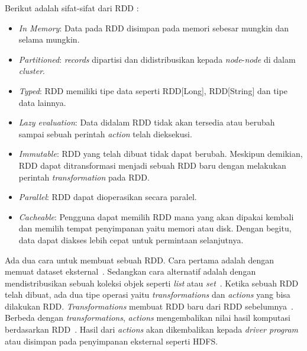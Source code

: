 Berikut adalah sifat-sifat dari RDD :
\begin{itemize}

\item \textit{In Memory}: Data pada RDD disimpan pada memori sebesar mungkin dan selama mungkin.

\item \textit{Partitioned}: \textit{records} dipartisi dan didistribusikan kepada \textit{node}-\textit{node} di dalam \textit{cluster}.

\item \textit{Typed}: RDD memiliki tipe data seperti RDD[Long], RDD[String] dan tipe data lainnya.

\item \textit{Lazy evaluation}: Data didalam RDD tidak akan tersedia atau berubah sampai sebuah perintah \textit{action} telah dieksekusi.

\item \textit{Immutable}: RDD yang telah dibuat tidak dapat berubah. Meskipun demikian, RDD
dapat ditransformasi menjadi sebuah RDD baru dengan melakukan perintah \textit{transformation}
pada RDD.

\item \textit{Parallel}: RDD dapat dioperasikan secara paralel.

\item \textit{Cacheable}: Pengguna dapat memilih RDD mana yang akan dipakai kembali dan memilih tempat penyimpanan yaitu memori atau disk. Dengan begitu, data dapat diakses lebih cepat untuk permintaan selanjutnya.\\

\end{itemize}

Ada dua cara untuk membuat sebuah RDD. Cara pertama adalah dengan memuat dataset eksternal~\cite{holdenkarau:07:ls}. Sedangkan cara alternatif adalah dengan mendistribusikan sebuah koleksi objek seperti \textit{list} atau \textit{set}~\cite{holdenkarau:07:ls}. Ketika sebuah RDD telah dibuat, ada dua tipe operasi yaitu \textit{transformations} dan \textit{actions} yang bisa dilakukan RDD. \textit{Transformations} membuat RDD baru dari RDD sebelumnya~\cite{holdenkarau:07:ls}. Berbeda dengan \textit{transformations}, \textit{actions} mengembalikan nilai hasil komputasi berdasarkan RDD~\cite{holdenkarau:07:ls}. Hasil dari \textit{actions} akan dikembalikan kepada \textit{driver program} atau disimpan pada penyimpanan eksternal seperti HDFS. \\

